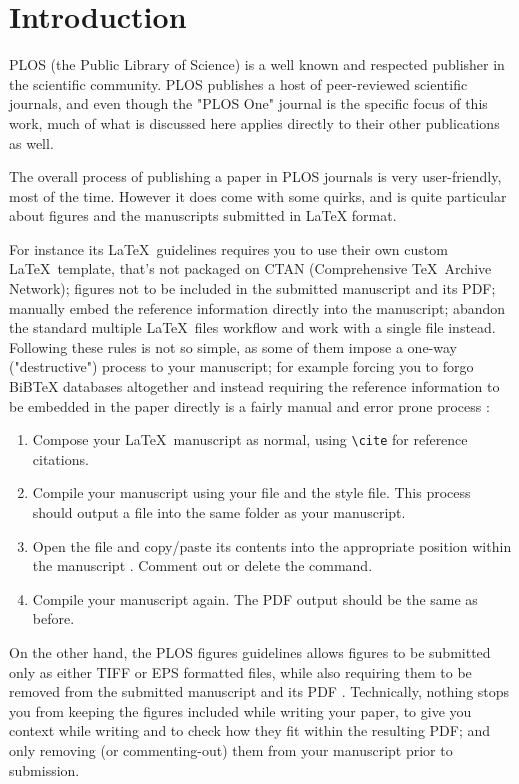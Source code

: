 \section*{Introduction}

PLOS (the Public Library of Science) is a well known and respected publisher in the scientific community.
PLOS publishes a host of peer-reviewed scientific journals, and even though the "PLOS One" journal is the specific focus of this work, much of what is discussed here applies directly to their other publications as well.

The overall process of publishing a paper in PLOS journals is very user-friendly, most of the time.
However it does come with some quirks, and is quite particular about figures and the manuscripts submitted in \LaTeX \cite{LaTeX} format.

For instance its \LaTeX~guidelines \cite{PLOS:LaTeX} requires you to
use their own custom \LaTeX~template, that's not packaged \cite{CTAN:plos} on CTAN (Comprehensive \TeX~Archive Network);
figures not to be included in the submitted  manuscript and its PDF;
manually embed the reference information directly into the  manuscript;
abandon the standard multiple \LaTeX~files workflow and work with a single  file instead.
Following these rules is not so simple, as some of them impose a one-way ("destructive") process to your manuscript; for example forcing you to forgo BiBTeX databases altogether and instead requiring the reference information to be embedded in the paper directly is a fairly manual and error prone process \cite{PLOS:LaTeX}:
\begin{enumerate}
    \item Compose your \LaTeX~manuscript as normal, using \verb|\cite| for reference citations.
    \item Compile your manuscript using your  file and the  style file. This process should output a  file into the same folder as your manuscript.
    \item Open the  file and copy/paste its contents into the appropriate position within the manuscript . Comment out or delete the  command.
    \item Compile your manuscript again. The PDF output should be the same as before.
\end{enumerate}

On the other hand, the PLOS figures guidelines \cite{PLOS:Figures} allows figures to be submitted only as either TIFF or EPS formatted files, while also requiring them to be removed from the submitted  manuscript and its PDF \cite{PLOS:LaTeX}.
Technically, nothing stops you from keeping the figures included while writing your paper, to give you context while writing and to check how they fit within the resulting PDF; and only removing (or commenting-out) them from your  manuscript prior to submission.

